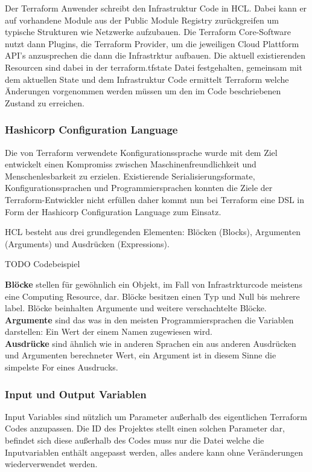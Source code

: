 \begin{spacing}{1.2}
Der Terraform Anwender schreibt den Infrastruktur Code in HCL. Dabei kann
er auf vorhandene Module aus der Public Module Registry zurückgreifen um
typische Strukturen wie Netzwerke aufzubauen. Die Terraform Core-Software
nutzt dann Plugins, die Terraform Provider, um die jeweiligen Cloud Plattform
API's anzusprechen die dann die Infrastrktur aufbauen. Die aktuell
existierenden Resourcen sind dabei in der terraform.tfstate Datei
festgehalten, gemeinsam mit dem aktuellen State und dem Infrastruktur Code
ermittelt Terraform welche Änderungen vorgenommen werden müssen um den
im Code beschriebenen Zustand zu erreichen.

\subsubsection{Hashicorp Configuration Language}

Die von Terraform verwendete Konfigurationssprache wurde mit dem Ziel
entwickelt einen Kompromiss zwischen Maschinenfreundlichkeit und
Menschenlesbarkeit zu erzielen. Existierende Serialisierungsformate,
Konfigurationssprachen und Programmiersprachen konnten die Ziele
der Terraform-Entwickler nicht erfüllen daher kommt nun bei Terraform
eine DSL in Form der Hashicorp Configuration Language zum Einsatz.

HCL besteht aus drei grundlegenden Elementen: Blöcken (Blocks), Argumenten
(Arguments) und Ausdrücken (Expressions).

TODO Codebeispiel

\textbf{Blöcke} stellen für gewöhnlich ein Objekt, im Fall von
Infrastrkturcode meistens eine Computing Resource, dar.
Blöcke besitzen einen Typ und Null bis mehrere label. Blöcke beinhalten
Argumente und weitere verschachtelte Blöcke.\\
\textbf{Argumente} sind das was in den meisten Programmiersprachen die
Variablen darstellen: Ein Wert der einem Namen zugewiesen wird.\\
\textbf{Ausdrücke} sind ähnlich wie in anderen Sprachen ein aus anderen
Ausdrücken und Argumenten berechneter Wert, ein Argument ist in diesem Sinne
die simpelste For eines Ausdrucks.

\subsubsection{Input und Output Variablen}

Input Variables sind nützlich um Parameter außerhalb des eigentlichen
Terraform Codes anzupassen. Die ID des Projektes stellt einen solchen
Parameter dar, befindet sich diese außerhalb des Codes muss nur die Datei
welche die Inputvariablen enthält angepasst werden, alles andere kann ohne
Veränderungen wiederverwendet werden.


\end{spacing}
